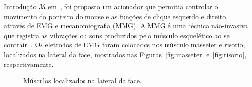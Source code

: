 \begin{chapter}{Introdução}
Já em~\cite{Kaushik12}, foi proposto um acionador que permitia controlar o
movimento do ponteiro do mouse e as funções de clique esquerdo e direito,
através de EMG e mecanomiografia (MMG). A MMG é uma técnica não-invasiva que
registra as vibrações ou sons produzidos pelo músculo esquelético ao se
contrair~\cite{Vaz99}. Os eletrodos de EMG foram colocados nos músculo masseter
e risório, localizados na lateral da face, mostrados nas
Figuras~\ref{fig:masseter} e~\ref{fig:risorio}, respectivamente. 



\begin{figure}
	\centering
	\quad
	\caption{Músculos localizados na lateral da face.}
	\label{fig:test}
\end{figure}



\end{chapter}
